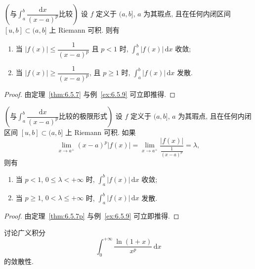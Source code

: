 \begin{corollary}\label{cor:6.5.2}
$\left(\text{与}\int_{a}^{b}\dfrac{\mathrm{d}x}{(x-a)^{p}}\text{比较}\right)$ 设 $f$ 定义于 $(a,b]$, $a$ 为其瑕点, 且在任何内闭区间 $[u,b]\subset(a,b]$ 上 Riemann 可积. 则有
\begin{enumerate}[label=(\arabic*)]
\item 当 $|f(x)|\leqslant\dfrac{1}{(x-a)^{p}}$ 且 $p<1$ 时, $\int_{a}^{b}|f(x)|\,\mathrm{d}x$ 收敛;
\item 当 $|f(x)|\geqslant\dfrac{1}{(x-a)^{p}}$, 且 $p\geqslant1$ 时, $\int_{a}^{b}|f(x)|\,\mathrm{d}x$ 发散.
\end{enumerate}
\end{corollary}

\begin{proof}
由定理~\ref{thm:6.5.7} 与例~\ref{ex:6.5.9} 可立即推得.
\end{proof}

\begin{corollaryp}\label{cor:6.5.2p}
$\left(\text{与}\int_{a}^{b}\dfrac{\mathrm{d}x}{(x-a)^{p}}\text{比较的极限形式}\right)$ 设 $f$ 定义于 $(a,b]$, $a$ 为其瑕点, 且在任何内闭区间 $[u,b]\subset(a,b]$ 上 Riemann 可积. 如果
\[
\lim_{x\to a^{+}}(x-a)^{p}|f(x)|=\lim_{x\to a^{+}}\frac{|f(x)|}{\frac{1}{(x-a)^{p}}}=\lambda,
\]
则有
\begin{enumerate}[label=(\arabic*)]
\item 当 $p<1$, $0\leqslant\lambda<+\infty$ 时, $\int_{a}^{b}|f(x)|\,\mathrm{d}x$ 收敛;
\item 当 $p\geqslant1$, $0<\lambda\leqslant+\infty$ 时, $\int_{a}^{b}|f(x)|\,\mathrm{d}x$ 发散.
\end{enumerate}
\end{corollaryp}

\begin{proof}
由定理~\ref{thm:6.5.7p} 与例~\ref{ex:6.5.9} 可立即推得.
\end{proof}

\begin{example}\label{ex:6.5.17}
讨论广义积分
\[
\int_{0}^{+\infty}\frac{\ln(1+x)}{x^{p}}\,\mathrm{d}x
\]
的敛散性.
\end{example}

